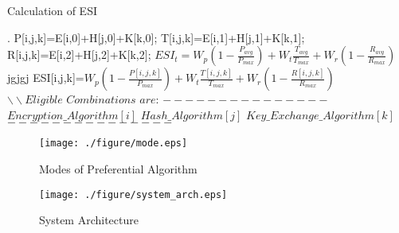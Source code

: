 \documentclass[3p,times]{elsarticle}
\begin{document}
\makeatletter
\def\BState{\State\hskip-\ALG@thistlm}
\makeatother
{}
\begin{algorithm}[]

\caption{Calculation of ESI}
\label{Algorithm:ESI}
\begin{algorithmic}[1]
                 .
                     \State P[i,j,k]=E[i,0]+H[j,0]+K[k,0];
                     \State T[i,j,k]=E[i,1]+H[j,1]+K[k,1];
                     \State R[i,j,k]=E[i,2]+H[j,2]+K[k,2];
                \EndFor
            \EndFor
    \EndFor
\State$ESI_t=W_p(1-\frac{P_{avg}}{P_{max}})+W_t\frac{T_{avg}}{T_{max}}+W_r(1-\frac{R_{avg}}{R_{max}})$
\if
\State jgjgj
\fi
{}
 \State ESI[i,j,k]=$W_p(1-\frac{P[i,j,k]}{P_{max}})+W_t\frac{T[i,j,k]}{T_{max}}+W_r(1-\frac{R[i,j,k]}{R_{max}})$
\State $ \backslash\backslash\textit{Eligible Combinations are:}$
\State $---------------$
\State $Encryption\_Algorithm[i]$
\State $Hash\_Algorithm[j]$
\State $Key\_Exchange\_Algorithm[k]$
\State $---------------$
\EndIf
                  \EndFor
            \EndFor
    \EndFor


  
\EndProcedure

\Statex

\end{algorithmic}


\end{algorithm}




\begin{figure}[!hp]
\centering
\vspace{-9pt}
\texttt{[image: ./figure/mode.eps]}
\vspace{-6pt}
\caption{Modes of Preferential Algorithm}
\label{fig:mode_fig}
\end{figure}
 
\begin{figure}[!hp]
\centering
\vspace{1pt}
\texttt{[image: ./figure/system\_arch.eps]}
\vspace{-6pt}
\caption{System Architecture}
\vspace{8pt}
\label{fig:system_arch_fig}
\end{figure}
\end{document}
